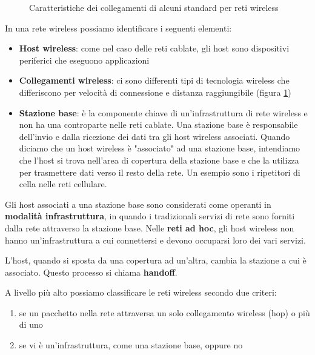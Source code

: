 \documentclass[11pt,a4paper]{article}
\begin{document}
{\begin{figure}
	\caption{Caratteristiche dei collegamenti di alcuni standard per reti wireless}
	\label{fig: 092}
\end{figure}
In una rete wireless possiamo identificare i seguenti elementi: 
\begin{itemize}
	\item \textbf{Host wireless}: come nel caso delle reti cablate, gli host sono dispositivi periferici che eseguono applicazioni
	\item \textbf{Collegamenti wireless}: ci sono differenti tipi di tecnologia wireless che differiscono per velocità di connessione e distanza raggiungibile (figura \ref{fig: 092})
	\item \textbf{Stazione base}: è la componente chiave di un'infrastruttura di rete wireless e non ha una controparte nelle reti cablate. Una stazione base è responsabile dell'invio e dalla ricezione dei dati tra gli host wireless associati. Quando diciamo che un host wireless è "associato" ad una stazione base, intendiamo che l'host si trova nell'area di copertura della stazione base e che la utilizza per trasmettere dati verso il resto della rete. Un esempio sono i ripetitori di cella nelle reti cellulare. 
\end{itemize}

Gli host associati a una stazione base sono considerati come operanti in \textbf{modalità infrastruttura}, in quando i tradizionali servizi di rete sono forniti dalla rete attraverso la stazione base. Nelle \textbf{reti ad hoc}, gli host wireless non hanno un'infrastruttura a cui connettersi e devono occuparsi loro dei vari servizi.

L'host, quando si sposta da una copertura ad un'altra, cambia la stazione a cui è associato. Questo processo si chiama \textbf{handoff}.

A livello più alto possiamo classificare le reti wireless secondo due criteri:
\begin{enumerate}
	\item se un pacchetto nella rete attraversa un solo collegamento wireless (hop) o più di uno
	\item se vi è un'infrastruttura, come una stazione base, oppure no
\end{enumerate}

}
\end{document}
